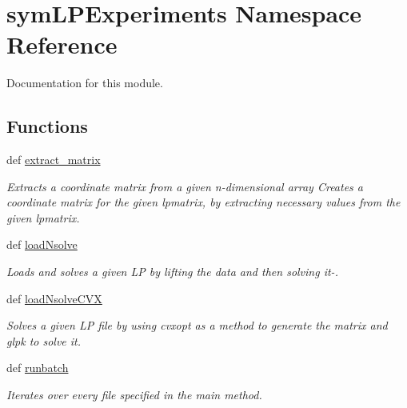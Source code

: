 \hypertarget{namespacesymLPExperiments}{\section{sym\-L\-P\-Experiments Namespace Reference}
\label{namespacesymLPExperiments}
}


Documentation for this module.  


\subsection*{Functions}
\begin{DoxyCompactItemize}
\item 
def \hyperlink{namespacesymLPExperiments_a00f49f67a2a2d9e675d6f392a28c6d21}{extract\-\_\-matrix}
\begin{DoxyCompactList}\small\item\em Extracts a coordinate matrix from a given n-\/dimensional array Creates a coordinate matrix for the given lpmatrix, by extracting necessary values from the given lpmatrix. \end{DoxyCompactList}\item 
def \hyperlink{namespacesymLPExperiments_a13db8437b54c2d6e412fdca6beebcd73}{load\-Nsolve}
\begin{DoxyCompactList}\small\item\em Loads and solves a given L\-P by lifting the data and then solving it-\/. \end{DoxyCompactList}\item 
def \hyperlink{namespacesymLPExperiments_aac02ec1af252db0b5351036a4725aa22}{load\-Nsolve\-C\-V\-X}
\begin{DoxyCompactList}\small\item\em Solves a given L\-P file by using cvxopt as a method to generate the matrix and glpk to solve it. \end{DoxyCompactList}\item 
def \hyperlink{namespacesymLPExperiments_a0b36c729a222467b8abb13726eeee5f5}{runbatch}
\begin{DoxyCompactList}\small\item\em Iterates over every file specified in the main method. \end{DoxyCompactList}\end{DoxyCompactItemize}
